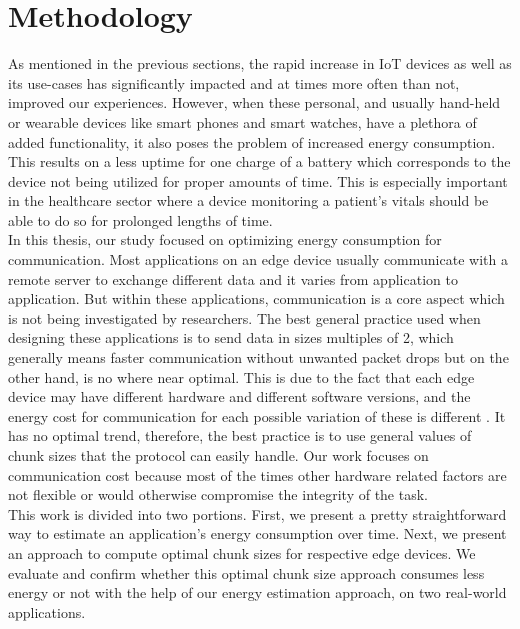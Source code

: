 \chapter{Methodology}
\newtheorem{definition}{Definition}
As mentioned in the previous sections, the rapid increase in IoT devices as well as its use-cases has 
significantly impacted and at times more often than not, improved our experiences. However, when these 
personal, and usually hand-held or wearable devices like smart phones and smart watches, have a 
plethora of added functionality, it also poses the problem of increased energy consumption. This results 
on a less uptime for one charge of a battery which corresponds to the device not being utilized for proper 
amounts of time. This is especially important in the healthcare sector where a device monitoring a patient's 
vitals should be able to do so for prolonged lengths of time. \\
In this thesis, our study focused on optimizing energy consumption for communication. Most applications 
on an edge device usually communicate with a remote server to exchange different data and it varies from 
application to application. But within these applications, communication is a core aspect which is not 
being investigated by researchers. 
The best general practice used when designing these applications is to send data in sizes multiples of 2, which 
generally means faster communication without unwanted packet drops but on the other hand, is no where near 
optimal. This is due to the fact that each edge device may have different hardware and different software 
versions, and the energy cost for communication for each possible variation of these is different \cite{6200281}. It has no 
optimal trend, therefore, the best practice is to use general values of chunk sizes that the protocol 
can easily handle. Our work focuses on communication cost because most of the times other hardware related 
factors are not flexible or would otherwise compromise the integrity of the task. \\

This work is divided into two portions. First, we present a pretty straightforward way to estimate an 
application's energy consumption over time. Next, we present an approach to compute optimal chunk sizes 
for respective edge devices. We evaluate and confirm whether this optimal chunk size approach consumes less 
energy or not with the help of our energy estimation approach, on two real-world applications. \\
